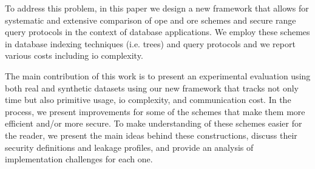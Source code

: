 	To address this problem, in this paper we design a new framework that allows for systematic and extensive comparison of \acrshort{ope} and \acrshort{ore} schemes and secure range query protocols in the context of database applications.
	We employ these schemes in database indexing techniques (i.e. {\BPlus} trees) and query protocols and we report various costs including \acrshort{io} complexity.

	The main contribution of this work is to present an experimental evaluation using both real and synthetic datasets using our new framework that tracks not only time but also primitive usage, \acrshort{io} complexity, and communication cost.
	In the process, we present improvements for some of the schemes that make them more efficient and/or more secure.
	To make understanding of these schemes easier for the reader, we present the main ideas behind these constructions, discuss their security definitions and leakage profiles, and provide an analysis of implementation challenges for each one.
